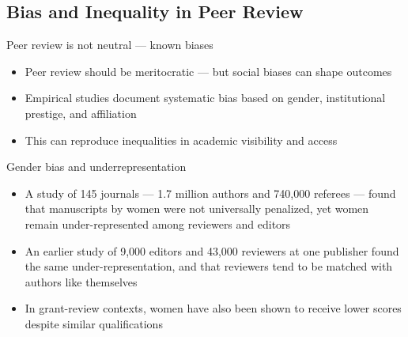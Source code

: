 \documentclass[aspectratio=169]{beamer}
\begin{document}

\subsection{Bias and Inequality in Peer Review}
\begin{frame}{Peer review is not neutral — known biases}
\begin{itemize}
  \item Peer review should be meritocratic — but social biases can shape outcomes
  \item Empirical studies document systematic bias based on gender, institutional prestige, and affiliation
  \item This can reproduce inequalities in academic visibility and access
\end{itemize}
\end{frame}

\begin{frame}{Gender bias and underrepresentation}
\begin{itemize}
  \item A study of 145 journals --- 1.7 million authors and 740,000 referees --- found that manuscripts by women were not universally penalized, yet women remain under-represented among reviewers and editors \citep{squazzoni2021genderbias}
  \item An earlier study of 9,000 editors and 43,000 reviewers at one publisher found the same under-representation, and that reviewers tend to be matched with authors like themselves \citep{helmer2017genderbias,murray2018homophily}
  \item In grant-review contexts, women have also been shown to receive lower scores despite similar qualifications
    \citep{wenneras1997nepotism}
  \end{itemize}
\end{frame}
\end{document}
